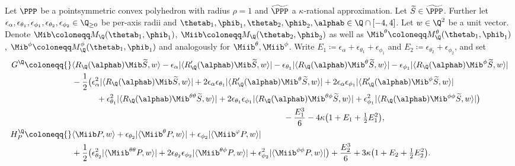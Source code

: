 \begin{theorem} \label{thm:global_rational}
\leanok
{}
    Let $\PPP$ be a pointsymmetric convex polyhedron with radius $\rho =1$ and $\widetilde{\PPP}$ a $\kappa$-rational approximation. Let $\widetilde{S} \in \widetilde{\PPP}$. Further let
    $\epsilon_\alpha, \epsilon_{\theta_1}, \epsilon_{\phi_1}, \epsilon_{\theta_2}, \epsilon_{\phi_2} \in \Q_{\geq 0}$
    be per-axis radii and $\thetab_1,\phib_1,\thetab_2,\phib_2,\alphab \in \Q \cap [-4,4]$.
    Let $w\in\Q^2$ be a unit vector. Denote $\Mib \coloneqq M_{\Q}(\thetab_1, \phib_1)$, $ \Miib \coloneqq M_{\Q}(\thetab_2, \phib_2)$ as well as $\Mib^{\theta} \coloneqq M_{\Q}^\theta(\thetab_1, \phib_1)$, $\Mib^{\phi} \coloneqq M_{\Q}^\phi(\thetab_1, \phib_1)$ and analogously for $\Miib^{\theta}, \Miib^{\phi}$. Write
    $E_1 \coloneqq \epsilon_\alpha + \epsilon_{\theta_1} + \epsilon_{\phi_1}$ and
    $E_2 \coloneqq \epsilon_{\theta_2} + \epsilon_{\phi_2}$, and set
    \begin{align*}
        G^{\Q} \coloneqq{}& \langle R_{\Q}(\alphab) \Mib \widetilde{S},w \rangle - \epsilon_\alpha|\langle R_{\Q}'(\alphab)  \Mib \widetilde{S},w \rangle| - \epsilon_{\theta_1}|\langle R_{\Q}(\alphab) \Mib^\theta \widetilde{S},w \rangle| - \epsilon_{\phi_1}|\langle R_{\Q}(\alphab) \Mib^\phi \widetilde{S},w \rangle| \\
        &- \frac{1}{2}\big(\epsilon_\alpha^2|\langle R_{\Q}(\alphab) \Mib \widetilde{S},w \rangle|
          + 2\epsilon_\alpha\epsilon_{\theta_1}|\langle R_{\Q}'(\alphab) \Mib^\theta \widetilde{S},w \rangle| + 2\epsilon_\alpha\epsilon_{\phi_1}|\langle R_{\Q}'(\alphab) \Mib^\phi \widetilde{S},w \rangle|\\
        &\qquad\quad + \epsilon_{\theta_1}^2|\langle R_{\Q}(\alphab) \Mib^{\theta\theta} \widetilde{S},w \rangle| + 2\epsilon_{\theta_1}\epsilon_{\phi_1}|\langle R_{\Q}(\alphab) \Mib^{\theta\phi} \widetilde{S},w \rangle| + \epsilon_{\phi_1}^2|\langle R_{\Q}(\alphab) \Mib^{\phi\phi} \widetilde{S},w \rangle|\big)\\
        & \hspace{9cm}- \frac{E_1^3}{6} - 4\kappa \big( 1 + E_1 + \tfrac12 E_1^2\big),\\
        H^{\Q}_P \coloneqq{}& \langle \Miib P,w \rangle + \epsilon_{\theta_2}|\langle \Miib^\theta P,w \rangle|+\epsilon_{\phi_2}|\langle  \Miib^\varphi P,w \rangle|\\
        &+ \frac{1}{2}\big(\epsilon_{\theta_2}^2|\langle \Miib^{\theta\theta} P,w \rangle| + 2\epsilon_{\theta_2}\epsilon_{\phi_2}|\langle \Miib^{\theta\phi} P,w \rangle| + \epsilon_{\phi_2}^2|\langle \Miib^{\phi\phi} P,w \rangle|\big) + \frac{E_2^3}{6} + 3\kappa\big( 1+E_2+\tfrac12 E_2^2\big).

\end{align*}
\end{theorem}
